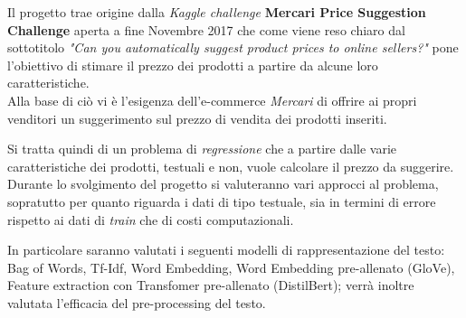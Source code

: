 



Il progetto trae origine dalla \textit{Kaggle challenge} \textbf{Mercari Price
Suggestion Challenge} \cite{mercari-price-suggestion-challenge} aperta a fine
Novembre 2017 che come viene reso chiaro dal sottotitolo \textit{"Can you
automatically suggest product prices to online sellers?"} pone l'obiettivo di
stimare il prezzo dei prodotti a partire da alcune loro caratteristiche. \\
Alla base di ciò vi è l'esigenza dell'e-commerce \textit{Mercari} \cite{mercari}
di offrire ai propri venditori un suggerimento sul prezzo di vendita dei
prodotti inseriti.

Si tratta quindi di un problema di \textit{regressione} che a partire dalle
varie caratteristiche dei prodotti, testuali e non, vuole calcolare il prezzo da
suggerire.
\\
Durante lo svolgimento del progetto si valuteranno vari approcci al problema,
sopratutto per quanto riguarda i dati di tipo testuale, sia in termini di errore
rispetto ai dati di \textit{train} che di costi computazionali.

In particolare saranno valutati i seguenti modelli di rappresentazione del
testo: Bag of Words, Tf-Idf, Word Embedding, Word Embedding pre-allenato (GloVe),
Feature extraction con Transfomer pre-allenato (DistilBert); verrà inoltre
valutata l'efficacia del pre-processing del testo.

